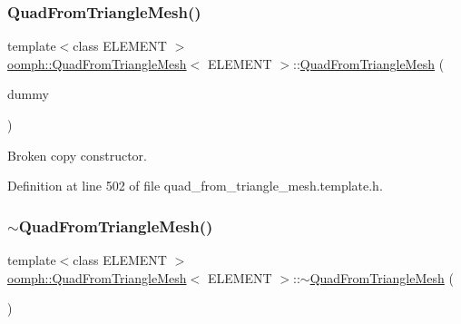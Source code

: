 \mbox{\label{classoomph_1_1QuadFromTriangleMesh_adc45cf7389f505a2f05d477474b2dcbb}} 
\subsubsection{\texorpdfstring{Quad\+From\+Triangle\+Mesh()}{QuadFromTriangleMesh()}\hspace{0.1cm}{\footnotesize\ttfamily [4/4]}}
{\footnotesize\ttfamily template$<$class E\+L\+E\+M\+E\+NT $>$ \\
\hyperlink{classoomph_1_1QuadFromTriangleMesh}{oomph\+::\+Quad\+From\+Triangle\+Mesh}$<$ E\+L\+E\+M\+E\+NT $>$\+::\hyperlink{classoomph_1_1QuadFromTriangleMesh}{Quad\+From\+Triangle\+Mesh} (\begin{DoxyParamCaption}\item[{const \hyperlink{classoomph_1_1QuadFromTriangleMesh}{Quad\+From\+Triangle\+Mesh}$<$ E\+L\+E\+M\+E\+NT $>$ \&}]{dummy }\end{DoxyParamCaption})\hspace{0.3cm}{\ttfamily [inline]}}



Broken copy constructor. 



Definition at line 502 of file quad\+\_\+from\+\_\+triangle\+\_\+mesh.\+template.\+h.

\mbox{\label{classoomph_1_1QuadFromTriangleMesh_aa8737e7a7e845cab4fb6fd82c8f3506d}} 
\subsubsection{\texorpdfstring{$\sim$\+Quad\+From\+Triangle\+Mesh()}{~QuadFromTriangleMesh()}}
{\footnotesize\ttfamily template$<$class E\+L\+E\+M\+E\+NT $>$ \\
\hyperlink{classoomph_1_1QuadFromTriangleMesh}{oomph\+::\+Quad\+From\+Triangle\+Mesh}$<$ E\+L\+E\+M\+E\+NT $>$\+::$\sim$\hyperlink{classoomph_1_1QuadFromTriangleMesh}{Quad\+From\+Triangle\+Mesh} (\begin{DoxyParamCaption}{ }\end{DoxyParamCaption})\hspace{0.3cm}{\ttfamily [inline]}}



